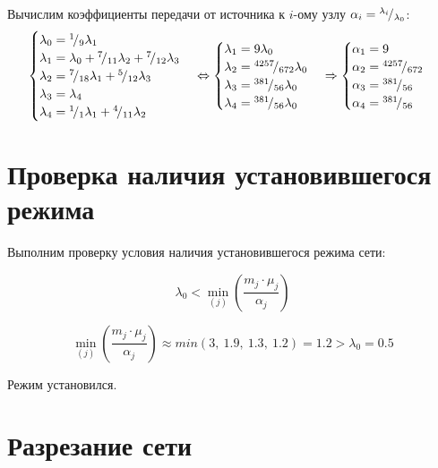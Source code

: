 Вычислим коэффициенты передачи от источника к $i$-ому узлу $\alpha_i = {}^{\lambda_i}\!/_{\lambda_0}$:
\begin{equation*}
	\begin{cases}
		\lambda_0 = \sfrac{1}{9} \lambda_1 \\
		\lambda_1 = \lambda_0 + \sfrac{7}{11} \lambda_2 + \sfrac{7}{12} \lambda_3 \\
		\lambda_2 = \sfrac{7}{18} \lambda_1 + \sfrac{5}{12} \lambda_3 \\
		\lambda_3 = \lambda_4 \\
		\lambda_4 = \sfrac{1}{1} \lambda_1 + \sfrac{4}{11} \lambda_2 \\
	\end{cases} \Leftrightarrow \begin{cases}
		\lambda_1 = 9 \lambda_0 \\
		\lambda_2 = \sfrac{4257}{672} \lambda_0 \\
		\lambda_3 = \sfrac{381}{56} \lambda_0 \\
		\lambda_4 = \sfrac{381}{56} \lambda_0
	\end{cases} \Rightarrow \begin{cases}
		\alpha_1 = 9 \\
		\alpha_2 = \sfrac{4257}{672} \\
		\alpha_3 = \sfrac{381}{56} \\
		\alpha_4 = \sfrac{381}{56}
	\end{cases}
\end{equation*}

\section{Проверка наличия установившегося режима}

Выполним проверку условия наличия установившегося режима сети:

\begin{equation*}
	\lambda_0 < \min \limits_{(j)} \left( \frac{m_j \cdot \mu_j}{\alpha_j} \right)
\end{equation*}

\begin{equation*}
	 \min \limits_{(j)} \left( \frac{m_j \cdot \mu_j}{\alpha_j} \right) \approx min \left(3,\ 1.9,\ 1.3,\ 1.2 \right) = 1.2 > \lambda_0 = 0.5
\end{equation*}

Режим установился.

\section{Разрезание сети}

